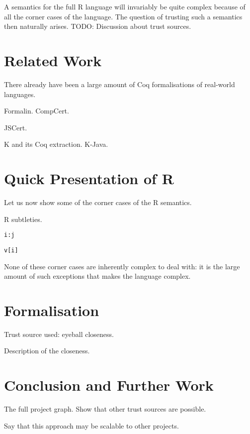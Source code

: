 \documentclass[9pt, sigplan, natbib=false]{acmart}
\newcommand\Coq{Coq}
\newcommand\R{R}
\begin{document}
A semantics for the full \R{} language will invariably
be quite complex because of all the corner cases
of the language.
The question of trusting such a semantics
then naturally arises.
%
TODO: Discussion about trust sources.

\section{Related Work}
\label{sec:related:work}

There already have been a large amount of \Coq{} formalisations
of real-world languages.

Formalin.
CompCert.

JSCert.

K and its \Coq{} extraction.
K-Java.

\section{Quick Presentation of \R{}}
\label{sec:presentation}

Let us now show some of the corner cases of the \R{} semantics.

\R{} subtleties.

\texttt{i:j}

\begin{verbatim}
v[i]
\end{verbatim}

None of these corner cases are inherently complex to deal with:
it is the large amount of such exceptions that makes the language complex.

\section{Formalisation}
\label{sec:formalisation}

Trust source used: eyeball closeness.

Description of the closeness.

\section{Conclusion and Further Work}
\label{sec:conclusion}

The full project graph.
Show that other trust sources are possible.

Say that this approach may be scalable to other projects.

\printbibliography
\end{document}
